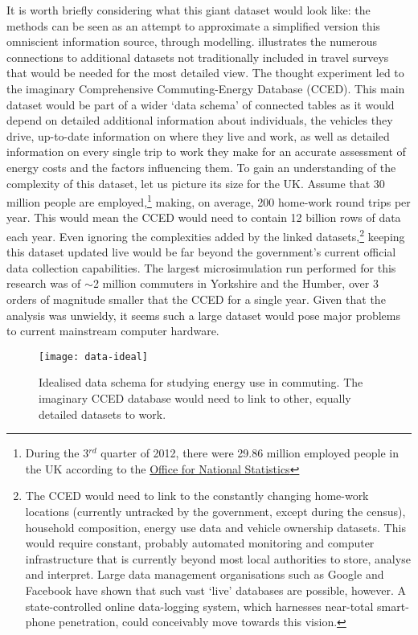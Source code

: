 It is worth briefly considering what this giant dataset would look like: the
methods can be seen as an attempt to approximate a simplified version this
omniscient information source, through modelling.  illustrates
the numerous connections to additional datasets not traditionally included in
travel surveys that would be needed for the most detailed view.
The thought experiment led to the imaginary Comprehensive
Commuting-Energy Database (CCED). This main dataset would be part of a wider
`data schema' of connected tables \citep{Obe2011} as it would depend on
detailed additional
information about individuals, the vehicles they drive, up-to-date
information on where they live and work, as well as detailed information on
every single trip to work they make for an accurate assessment of energy costs
and the factors influencing them. To gain an understanding of the complexity of
this dataset, let us picture its size for the UK. Assume that 30 million people
are employed,\footnote{During
the 3$^{rd}$ quarter of 2012, there were 29.86 million
employed
people in the UK according to the
\href{http://www.ons.gov.uk/ons/dcp171778_292911.pdf}{Office for National
Statistics}}
making, on average, 200
home-work round trips per year. This would mean the CCED would need to contain
12 billion rows of data each year. Even ignoring the complexities added by the
linked datasets,\footnote{The CCED would need to link to the constantly changing
home-work
locations (currently untracked by the government, except during the census),
household composition, energy use data and vehicle ownership datasets. This
would require constant, probably automated monitoring and computer
infrastructure that is currently beyond most local authorities to store, analyse
and interpret. Large data management
organisations such as Google and Facebook have shown that such vast
`live' databases are possible, however. A state-controlled online
data-logging system, which harnesses near-total smart-phone penetration, could
conceivably move towards this vision. } keeping this dataset updated live would
be far beyond the government's current official data collection capabilities.
The largest microsimulation run performed for this research was of $\sim$2 million
commuters in Yorkshire and the Humber, over 3 orders of magnitude smaller that
the CCED for a single year. Given that the analysis was unwieldy, it seems such
a large dataset would pose major problems to current mainstream computer
hardware.

\begin{figure}
\texttt{[image: data-ideal]}
\caption[Idealised data schema for studying energy use in commuting]{Idealised
data schema for studying energy use in commuting. The imaginary CCED database
would need to link to other, equally detailed datasets to work.}
\label{fdata-ideal}
\end{figure}

